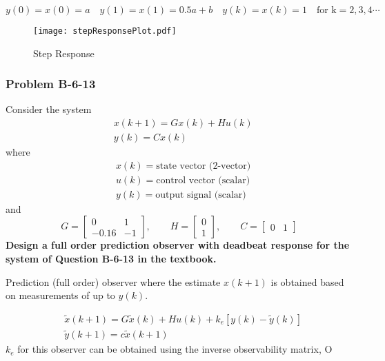  $y(0)=x(0)=a \quad y(1)=x(1)=0.5a+b \quad y(k)=x(k)=1 \quad  \text{for k}=2,3,4 \cdots $
 
 \begin{figure}[H]
 	\centering
 	\texttt{[image: stepResponsePlot.pdf]}
 	\caption{Step Response}
 \end{figure}

\subsubsection*{Problem B-6-13}
Consider the system
\begin{align*}
& x(k+1)=Gx(k)+Hu(k) \\
& y(k) = Cx(k)
\end{align*}
where 
\begin{align*}
& x(k) = \text{state vector (2-vector)} \\
& u(k) = \text{control vector (scalar)} \\
& y(k) =  \text{output signal (scalar)}
\end{align*}
and 
\[
G = \begin{bmatrix}
0     & 1 \\
-0.16 & -1
\end{bmatrix}, \qquad
H = \begin{bmatrix}
0    \\
1
\end{bmatrix}, \qquad 
C = \begin{bmatrix}
0  & 1
\end{bmatrix}
\]
\textbf{Design a full order prediction observer with deadbeat response for the system of Question B-6-13 in the textbook.}

Prediction (full order) observer where the estimate $x(k+1)$ is obtained based on measurements of up to $y(k)$.

\vspace*{-1cm}

\begin{align*}
& \tilde{x}(k+1)=G\tilde{x}(k)+Hu(k)+k_e[y(k)-\tilde{y}(k)] \\
& \tilde{y}(k+1) = c\tilde{x}(k+1) 
\end{align*}
$k_e$ for this observer can be obtained using the inverse observability matrix, O

